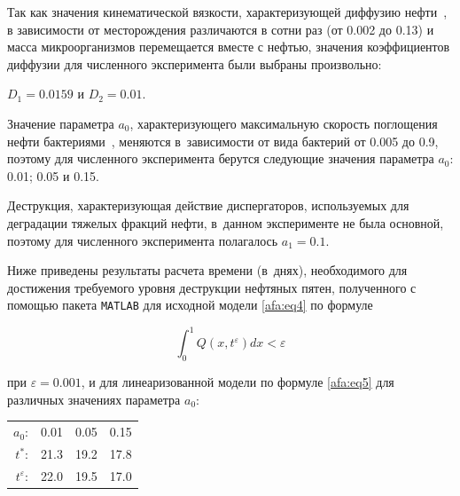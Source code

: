 Так как значения кинематической вязкости, характеризующей диффузию нефти~\cite{afa:bib11}, в зависимости от месторождения различаются в сотни раз (от 0.002 до 0.13) и масса микроорганизмов перемещается вместе с нефтью,  значения коэффициентов диффузии для численного эксперимента были выбраны произвольно:

$D_1 =0.0159$ и $D_2 =0.01$. 

Значение параметра $a_0$, характеризующего максимальную скорость поглощения нефти бактериями~\cite{afa:bib11}, меняются в~зависимости от вида бактерий от 0.005 до 0.9, поэтому для численного эксперимента  берутся  следующие значения параметра $a_0$: 0.01; 0.05 и 0.15. 

Деструкция, характеризующая действие диспергаторов, используемых для деградации тяжелых фракций нефти, в~данном эксперименте не была основной, поэтому для численного эксперимента полагалось $a_1=0.1$. 



Ниже приведены результаты расчета времени (в~днях), необходимого для достижения требуемого уровня деструкции нефтяных пятен, полученного с помощью пакета {\tt MATLAB} для исходной модели \eqref{afa:eq4} по формуле

\begin{equation}


\int_0^1 Q(x, t^\varepsilon) d x


<\varepsilon

\label{afa:new}

\end{equation}

при  $\varepsilon =0.001$, и для линеаризованной модели по формуле \eqref{afa:eq5}  для различных значениях параметра $a_0$:



\smallskip



{ \centering



\begin{tabular}{rrrr} 

$a_0$: & 0.01 & 0.05 & 0.15 \\ 

$t^*$:   & 21.3   & 19.2 & 17.8 \\ 

$t^\varepsilon$:   & 22.0   & 19.5 & 17.0 \\ 

\end{tabular}



}



